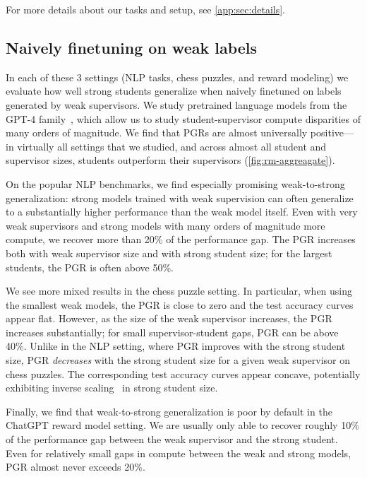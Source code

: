 For more details about our tasks and setup, see \ref{app:sec:details}.

\subsection{Naively finetuning on weak labels}
\label{section:baselines}

In each of these 3 settings (NLP tasks, chess puzzles, and reward modeling) we evaluate how well strong students generalize when naively finetuned on labels generated by weak supervisors. We study pretrained language models from the GPT-4 family~\citep{openai2023gpt}, which allow us to study student-supervisor compute disparities of many orders of magnitude. We find that PGRs are almost universally positive---in virtually all settings that we studied, and across almost all student and supervisor sizes, students outperform their supervisors (\ref{fig:rm-aggreagate}).

On the popular NLP benchmarks, we find especially promising weak-to-strong generalization: strong models trained with weak supervision can often generalize to a substantially higher performance than the weak model itself. Even with very weak supervisors and strong models with many orders of magnitude more compute, we recover more than 20\% of the performance gap. The PGR increases both with weak supervisor size and with strong student size; for the largest students, the PGR is often above 50\%.

We see more mixed results in the chess puzzle setting. In particular, when using the smallest weak models, the PGR is close to zero and the test accuracy curves appear flat. However, as the size of the weak supervisor increases, the PGR increases substantially;  for small supervisor-student gaps, PGR can be above 40\%.
Unlike in the NLP setting, where PGR improves with the strong student size, PGR \textit{decreases} with the strong student size for a given weak supervisor on chess puzzles. The corresponding test accuracy curves appear concave, potentially exhibiting inverse scaling~\citep{mckenzie2023inverse} in strong student size.

Finally, we find that weak-to-strong generalization is poor by default in the ChatGPT reward model setting. We are usually only able to recover roughly 10\% of the performance gap between the weak supervisor and the strong student. Even for relatively small gaps in compute between the weak and strong models, PGR almost never exceeds 20\%.

